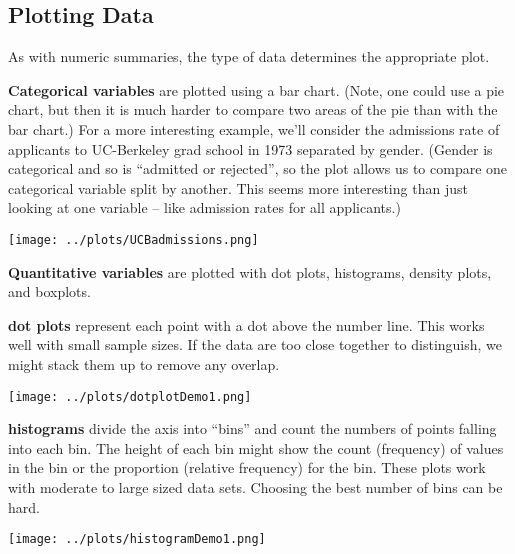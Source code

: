 \subsection {  Plotting Data}


 As with numeric summaries, the type of data determines the
 appropriate plot. \vspace{-.5cm}
\begin{list}{}{}
\item [\bf Categorical variables] are plotted using a bar
  chart. (Note, one could use a pie chart, but then it is much harder
  to compare two areas of the pie than with the bar chart.)
  For a more interesting example, we'll consider the admissions rate
  of applicants  to UC-Berkeley grad school in 1973 separated by
  gender. (Gender is categorical and so is ``admitted or  rejected'',
  so the plot allows us to compare one categorical variable split by
  another. This seems more interesting than just looking at one
  variable -- like admission rates for all applicants.)

  \begin{center}
  \texttt{[image: ../plots/UCBadmissions.png]}
  \end{center}
  
\item [\bf Quantitative variables] are plotted with dot plots, histograms,
  density plots, and boxplots.

  \begin{list}{}{}
  \item [\bf dot plots] represent each point with a dot above the number
    line. This works well with small sample sizes.  If the data are
    too close together to distinguish, we might stack them up to
    remove any overlap. \vspace{-1cm}

  \begin{center}
  \texttt{[image: ../plots/dotplotDemo1.png]}
  \end{center}

  \item [\bf histograms] divide the axis into ``bins'' and count the
    numbers of points falling into each bin.  The height of each bin might
    show the count (frequency) of values in the bin or the proportion
    (relative frequency) for the bin.  These plots work with moderate
    to large sized data sets.  Choosing the best number of bins can be
    hard. \vspace{-.4cm}
  \begin{center}
  \texttt{[image: ../plots/histogramDemo1.png]}
  \end{center}



\end{list}
\end{list}
